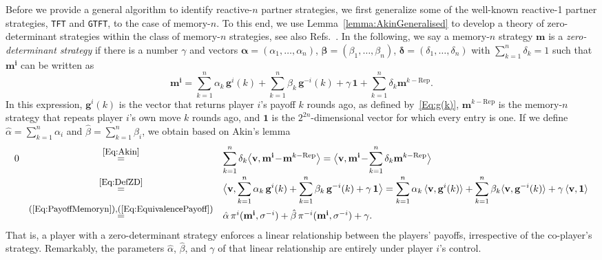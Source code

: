 \documentclass[9pt,twoside,lineno]{pnas-new}
\theoremstyle{plainCl1}
\theoremstyle{plainCl2}
\def\tft{\texttt{TFT}}
\def\gtft{\texttt{GTFT}}
\begin{document}
Before we provide a general algorithm to identify reactive-$n$ partner strategies, we first generalize some of the well-known reactive-1 partner strategies, \tft{} and \gtft{}, to the case of memory-$n$. 
To this end, we use Lemma~\ref{lemma:AkinGeneralised} to develop a theory of zero-determinant strategies within the class of memory-$n$ strategies, see also Refs.~\citep{ueda:RSOP:2021, Ueda:ORF:2022}.
In the following, we say a memory-$n$ strategy $\mathbf{m}$ is a {\it zero-determinant
strategy} if there is a number $\gamma$ and vectors $\boldsymbol{\alpha}\!=\!(\alpha_1,\ldots,\alpha_n)$, $\boldsymbol{\beta}\!=\!(\beta_1,\ldots,\beta_n)$, $\boldsymbol{\delta}\!=\!(\delta_1,\ldots,\delta_n)$ with $\sum_{k=1}^n \delta_k =1$ such that 
$\mathbf{m^{i}}$ can be written as
\begin{equation} \label{Eq:DefZD}
\mathbf{m^{i}} = \sum_{k=1}^n\alpha_k\, \mathbf{g}^i(k) + \sum_{k=1}^n\beta_k\, \mathbf{g}^{-i}(k) + \gamma\, \mathbf{1} + \sum_{k=1}^n \delta_k\mathbf{m}^{k-\text{Rep}}. 
\end{equation}
In this expression, $\mathbf{g}^i(k)$ is the vector that returns player $i$'s payoff $k$ rounds ago, as defined by~\eqref{Eq:g(k)}, $\mathbf{m}^{k-\text{Rep}}$ is the memory-$n$ strategy that repeats player $i$'s own move $k$ rounds ago, and $\mathbf{1}$ is the $2^{2n}$-dimensional vector for which every entry is one. If we define $\hat \alpha \!=\! \sum_{k=1}^n \alpha_i$ and $\hat \beta \!=\! \sum_{k=1}^n \beta_i$, we obtain based on Akin's lemma
\begin{equation} \label{Eq:PayoffZD}
\begin{array}{lcl}
0 
&\stackrel{\mbox{\small \eqref{Eq:Akin}}}{=}  
&\displaystyle \sum_{k=1}^n \delta_k \big\langle \mathbf{v} , \mathbf{m^i}\!-\!\mathbf{m}^{k-\text{Rep}}\big\rangle
 = \big\langle \mathbf{v} , \mathbf{m^i}\!-\!\sum_{k=1}^n \delta_k\mathbf{m}^{k-\text{Rep}}\big\rangle\\[0.4cm]
&\displaystyle \stackrel{\mbox{\small \eqref{Eq:DefZD}}}{=} 
&\displaystyle \big\langle \mathbf{v} ,\sum_{k=1}^n\alpha_k\, \mathbf{g}^i(k) + \sum_{k=1}^n\beta_k\, \mathbf{g}^{-i}(k) + \gamma\, \mathbf{1} \big\rangle
= \sum_{k=1}^n\alpha_k \, \langle \mathbf{v},\mathbf{g}^i(k)\rangle + \sum_{k=1}^n\beta_k \langle \mathbf{v},\mathbf{g}^{-i}(k) \rangle+\gamma\,\langle\mathbf{v},\mathbf{1}\rangle\\[0.3cm]
&\stackrel{\mbox{\small (\ref{Eq:PayoffMemoryn}),(\ref{Eq:EquivalencePayoff})}}{=} 
&\hat \alpha \, \pi^i(\mathbf{m^i},\sigma^{-i}) + \hat \beta \, \pi^{-i}(\mathbf{m^i},\sigma^{-i}) + \gamma.
\end{array}
\end{equation}
That is, a player with a zero-determinant strategy enforces a linear relationship between the players' payoffs, irrespective of the co-player's strategy. 
Remarkably, the parameters $\hat \alpha$, $\hat \beta$, and $\gamma$ of that linear relationship are entirely under player $i$'s control.\\
\end{document}
